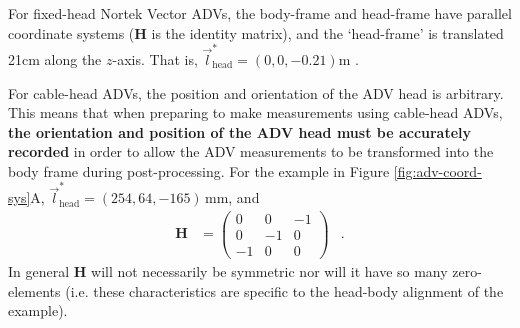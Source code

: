 \documentclass[twocol]{ametsoc}
\newcommand{\unit}[1]{\ensuremath{\,\mathrm{#1}}}
\def\rmat{\ensuremath{\mathbf{H}}}
\def\bhv{\ensuremath{\vec{l}_\mathrm{head}^*}}
\begin{document}
For fixed-head Nortek Vector ADVs, the body-frame and head-frame have parallel coordinate systems ($\rmat$ is the identity matrix), and the `head-frame' is translated 21cm along the $z$-axis.  That is, $\bhv = (0, 0, -0.21)$m \cite[]{vector_manual2005}.  

For cable-head ADVs, the position and orientation of the ADV head is arbitrary.  This means that when preparing to make measurements using cable-head ADVs, {\bf the orientation and position of the ADV head must be accurately recorded} in order to allow the ADV measurements to be transformed into the body frame during post-processing. For the example in Figure \ref{fig:adv-coord-sys}A, $\bhv = (254,64,-165)\unit{mm}$, and
\begin{align*}
  \rmat &= \left (
    \begin{array}{ccc}
      0 & 0 & -1 \\
      0 & -1 & 0 \\
      -1 & 0 & 0
    \end{array}
    \right ) & .
\end{align*}
In general $\rmat$ will not necessarily be symmetric nor will it have so many zero-elements (i.e. these characteristics are specific to the head-body alignment of the example).
\end{document}
